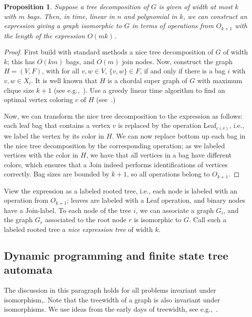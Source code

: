 \documentclass[a4paper,11pt]{article}
\newtheorem{proposition}[lemma]{Proposition}
\theoremstyle{definition}
\theoremstyle{remark}
\begin{document}
\begin{proposition}
  Suppose a tree decomposition of $G$ is given of width at most $k$
  with $m$ bags.  Then, in time, linear in $n$ and polynomial in $k$,
  we can construct an expression giving a graph isomorphic to $G$ in
  terms of operations from $O_{k+1}$ with the length of the expression
  $O(mk)$.
\end{proposition}

\begin{proof}
  First build with standard methods a nice tree decomposition of $G$
  of width $k$; this has $O(km)$ bags, and $O(m)$ join nodes.  Now,
  construct the graph $H=(V,F)$, with for all $v,w\in V$, $\{v,w\}\in
  F$, if and only if there is a bag $i$ with $v,w\in X_i$.  It is well
  known that $H$ is a chordal super graph of $G$ with maximum clique
  size $k+1$ (see e.g.,~\cite{Bodlaender98}).  Use a greedy linear
  time algorithm to find an optimal vertex coloring $c$ of $H$
  (see~\cite[Section 4.7]{Golumbic80}.)
  
  Now, we can transform the nice tree decomposition to the expression
  as follows: each leaf bag that contains a vertex $v$ is replaced by
  the operation Leaf$_{c(v)}$, i.e., we label the vertex by its color
  in $H$.  We can now replace bottom up each bag in the nice tree
  decomposition by the corresponding operation; as we labeled vertices
  with the color in $H$, we have that all vertices in a bag have
  different colors, which ensures that a Join indeed performs
  identifications of vertices correctly.  Bag sizes are bounded by
  $k+1$, so all operations belong to $O_{k+1}$.
\end{proof}

View the expression as a labeled rooted tree, i.e., each node is
labeled with an operation from $O_{k+1}$; leaves are labeled with a
Leaf operation, and binary nodes have a Join-label.  To each node of
the tree $i$, we can associate a graph $G_i$, and the graph $G_r$
associated to the root node $r$ is isomorphic to $G$.  Call such a
labeled rooted tree a {\em nice expression tree} of width $k$.

\subsection{Dynamic programming and finite state tree automata}
The discussion in this paragraph holds for all problems invariant
under isomorphism,.  Note that the treewidth of a graph is also
invariant under isomorphisms.  We use ideas from the early days of
treewidth, see e.g.,~\cite{FellowsL89,AbrahamsonF93}.
\end{document}

